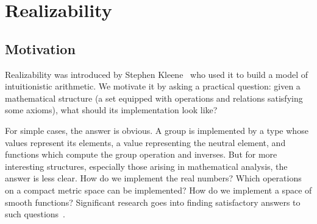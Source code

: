 \chapter{Realizability}
\label{chap:realizability}

\section{Motivation}
\label{sec:realizability-basic-idea}

Realizability was introduced by Stephen Kleene~ who used it to build a model of intuitionistic arithmetic. We motivate it by asking a practical question: given a mathematical structure (a set equipped with operations and relations satisfying some axioms), what should its implementation look like?

For simple cases, the answer is obvious. A group is implemented by a type whose values represent its elements, a value
representing the neutral element, and functions which compute the group operation and inverses.
But for more interesting structures, especially those arising in mathematical analysis, the answer is less clear. How do we implement the real numbers? Which operations on a compact metric space can be implemented? How do we implement a space of smooth functions? Significant research goes into finding satisfactory answers to such questions~.

